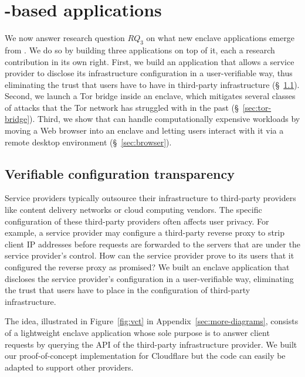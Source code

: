 \section{\Tool{}-based applications}%
\label{sec:applications}

We now answer research question $RQ_3$ on what new enclave applications
emerge from \tool{}.  We do so by building three applications on top of it, each
a research contribution in its own right.
%
First, we build an application that allows a service provider to disclose its
infrastructure configuration in a user-verifiable way, thus eliminating the
trust that users have to have in third-party infrastructure (\S~\ref{sec:vct}).
%
Second, we launch a Tor bridge inside an enclave, which mitigates several
classes of attacks that the Tor network has struggled with in the past
(\S~\ref{sec:tor-bridge}).
%
Third, we show that \tool{} can handle computationally expensive workloads by
moving a Web browser into an enclave and letting users interact with it via a
remote desktop environment (\S~\ref{sec:browser}).

\subsection{Verifiable configuration transparency}%
\label{sec:vct}

Service providers typically outsource their infrastructure to third-party
providers like content delivery networks or cloud computing vendors.  The
specific configuration of these third-party providers often affects user
privacy.  For example, a service provider may configure a third-party reverse
proxy to strip client IP addresses before requests are forwarded to the servers
that are under the service provider's control.  How can the service provider
prove to its users that it configured the reverse proxy as promised?  We built
an enclave application that discloses the service provider's configuration in a
user-verifiable way, eliminating the trust that users have to place in the
configuration of third-party infrastructure.

The idea, illustrated in Figure~\ref{fig:vct} in
Appendix~\ref{sec:more-diagrams}, consists of a lightweight enclave application
whose sole purpose is to answer client requests by querying the API of the
third-party infrastructure provider.  We built our proof-of-concept
implementation for Cloudflare but the code can easily be adapted to support
other providers.

